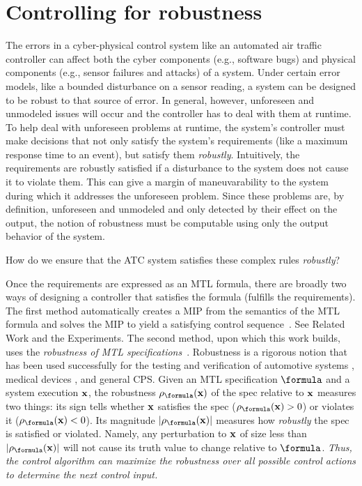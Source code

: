 \section{Controlling for robustness}
\label{sec:intro}
The errors in a cyber-physical control system like an automated air traffic controller can affect both the cyber components (e.g., software bugs) and physical components (e.g., sensor failures and attacks) of a system. 
Under certain error models, like a bounded disturbance on a sensor reading, a system can be designed to be robust to that source of error.
In general, however, unforeseen and unmodeled issues will occur and the controller has to deal with them at runtime. 
To help deal with unforeseen problems at runtime, the system's controller must make decisions that not only satisfy the system's requirements (like a maximum response time to an event), but satisfy them \textit{robustly}. 
Intuitively, the requirements are robustly satisfied if a disturbance to the system does not cause it to violate them.
This can give a margin of maneuvarability to the system during which it addresses the unforeseen problem.
Since these problems are, by definition, unforeseen and unmodeled and only detected by their effect on the output, the notion of robustness must be computable using only the output behavior of the system.



How do we ensure that the ATC system satisfies these complex rules \textit{robustly}?



Once the requirements are expressed as an MTL formula, there are broadly two ways of designing a controller that satisfies the formula (fulfills the requirements).
The first method automatically creates a MIP from the semantics of the MTL formula and solves the MIP to yield a satisfying control sequence~\cite{Raman14_MPCSTL,Saha_acc16,KaramanF11_LTLrouting}.
See Related Work and the Experiments.
The second method, upon which this work builds, uses the \textit{robustness of MTL specifications}~\cite{Fainekos2006_TLVerifSimu,Donze2010}.
Robustness is a rigorous notion that has been used successfully for the testing and verification of automotive systems \cite{Fainekos12_Automotive,Dreossi15_RRTFalsification}, medical devices \cite{SankaranarayananF2012cmsb}, and general CPS.
Given an MTL specification $\formula$ and a system execution $\mathbf{x}$, the robustness $\robf(\sstraj)$ of the spec relative to $\mathbf{x}$ measures two things:
its sign tells whether $\mathbf{x}$ satisfies the spec ($\robf(\sstraj) > 0$) or violates it ($\robf(\sstraj) <0$).
Its magnitude $|\robf(\sstraj)|$ measures how \textit{robustly} the spec is satisfied or violated.
Namely, any perturbation to $\mathbf{x}$ of size less than $|\robf(\sstraj)|$ will not cause its truth value to change relative to $\formula$.
\textit{Thus, the control algorithm can \textit{maximize} the robustness over all possible control actions to determine the next control input.}

